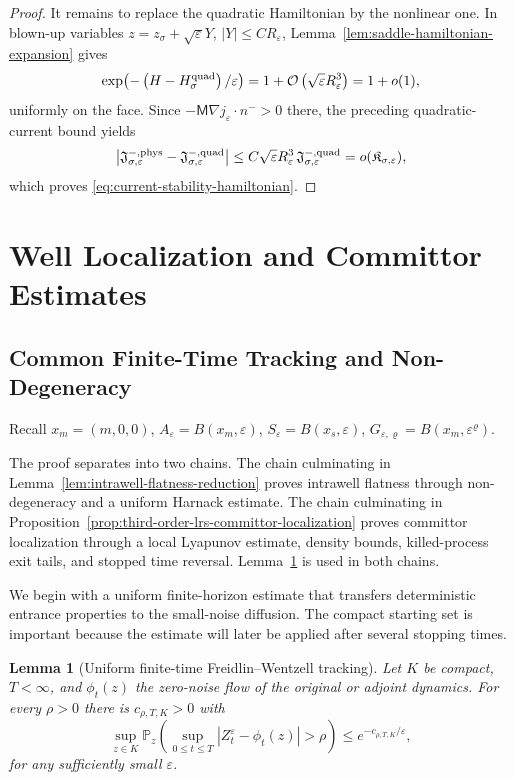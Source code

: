 \documentclass[11pt]{article}
\numberwithin{equation}{section}
\theoremstyle{plain}
\newtheorem{lemma}[theorem]{Lemma}
\theoremstyle{definition}
\theoremstyle{remark}
\newcommand{\eps}{\varepsilon}
\newcommand{\Pbb}{\mathbb P}
\begin{document}
\begin{proof}
It remains to replace the quadratic Hamiltonian by the nonlinear one.  In
blown-up variables $z=z_\sigma+\sqrt\eps Y$, $|Y|\le CR_\eps$,
Lemma~\ref{lem:saddle-hamiltonian-expansion} gives
\[
\exp\!\left(-\left(H-H_\sigma^{\rm quad}\right)/\eps\right)
=1+\mathcal O\left(\sqrt\eps R_\eps^3\right)=1+o(1),
\]
uniformly on the face.  Since
$-\mathsf M\nabla j_\eps\cdot n^->0$ there, the preceding quadratic-current
bound yields
\[
\left|\mathfrak J_{\sigma,\eps}^{-,\rm phys}
-\mathfrak J_{\sigma,\eps}^{-,\rm quad}\right|
\le C\sqrt\eps R_\eps^3\,
\mathfrak J_{\sigma,\eps}^{-,\rm quad}
=o(\mathfrak K_{\sigma,\eps}),
\]
which proves \eqref{eq:current-stability-hamiltonian}.
\end{proof}


\section{Well Localization and Committor Estimates}
\label{app:well-localization}

\subsection{Common Finite-Time Tracking and Non-Degeneracy}

Recall $x_m=(m,0,0)$, $A_\eps=B(x_m,\eps)$, $S_\eps=B(x_s,\eps)$,
$G_{\eps,\varrho}=B(x_m,\eps^\varrho)$.

The proof separates into two chains.  The chain culminating in
Lemma~\ref{lem:intrawell-flatness-reduction} proves intrawell flatness through
non-degeneracy and a uniform Harnack estimate.  The chain culminating in
Proposition~\ref{prop:third-order-lrs-committor-localization} proves committor
localization through a local Lyapunov estimate, density bounds, killed-process
exit tails, and stopped time reversal.  Lemma~\ref{lem:uniform-fw-tracking} is
used in both chains.

We begin with a uniform finite-horizon estimate that transfers
deterministic entrance properties to the small-noise diffusion.  The compact
starting set is important because the estimate will later be applied after
several stopping times.

\begin{lemma}[Uniform finite-time Freidlin--Wentzell tracking]
\label{lem:uniform-fw-tracking}
Let $K$ be compact, $T<\infty$, and $\phi_t(z)$ the zero-noise flow of the
original or adjoint dynamics.  For every $\rho>0$ there is $c_{\rho,T,K}>0$ with
\[
\sup_{z\in K}\Pbb_z\left(\sup_{0\le t\le T}\left|Z_t^\eps-\phi_t(z)\right|>\rho\right)\le e^{-c_{\rho,T,K}/\eps},
\]
for any sufficiently small $\eps$.
\end{lemma}
\end{document}
